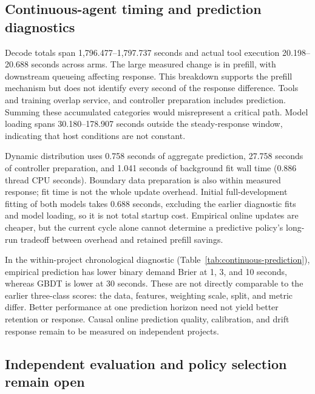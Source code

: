 \documentclass[sigconf, screen, review]{acmart}
\begin{document}
\subsection{Continuous-agent timing and prediction diagnostics}



Decode totals span 1,796.477--1,797.737 seconds and actual tool execution
20.198--20.688 seconds across arms. The large measured change is in
prefill, with downstream queueing affecting response. This breakdown
supports the prefill mechanism but does not identify every second of
the response difference. Tools and training overlap service, and
controller preparation includes prediction. Summing these accumulated
categories would misrepresent a critical path. Model loading spans
30.180--178.907 seconds outside the steady-response window, indicating
that host conditions are not constant.

Dynamic distribution uses 0.758 seconds of aggregate prediction,
27.758 seconds of controller preparation, and 1.041 seconds of
background fit wall time (0.886 thread CPU seconds). Boundary data
preparation is also within measured response; fit time is not the whole
update overhead. Initial full-development fitting of both models takes
0.688 seconds, excluding the earlier diagnostic fits and model loading,
so it is not total startup cost. Empirical online updates are cheaper,
but the current cycle alone cannot determine a predictive policy's
long-run tradeoff between overhead and retained prefill savings.



In the within-project chronological diagnostic
(Table~\ref{tab:continuous-prediction}), empirical prediction has lower
binary demand Brier at 1, 3, and 10 seconds, whereas GBDT is lower at
30 seconds. These are not directly comparable to the earlier
three-class scores: the data, features, weighting scale, split, and
metric differ. Better performance at one prediction horizon need not
yield better retention or response. Causal online prediction quality,
calibration, and drift response remain to be measured on independent
projects.

\subsection{Independent evaluation and policy selection remain open}
\end{document}
